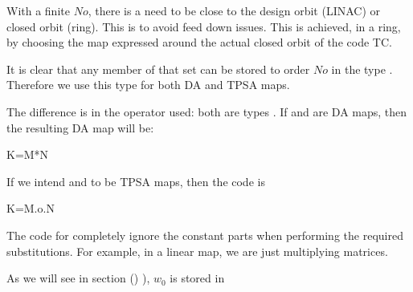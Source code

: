 \documentclass{hitec}     %
\begin{document}
{{{{With a finite $No$, there is a need to be close to the design orbit (LINAC) or closed orbit (ring). This is to avoid feed down issues. This is achieved, in a ring, by choosing the map expressed around the actual closed orbit of the code TC.

It is clear that any member of that set can be stored to order $No$ in the type . Therefore we use this type for both DA and TPSA maps.

 The difference is in the operator used: both are types . If  and  are DA maps, then the resulting DA map  will be:

\begin{code}
K=M*N
\end{code}

If we intend  and  to be TPSA maps, then the code is

\begin{code}
K=M.o.N
\end{code}

The code for  completely ignore the constant parts when performing the required substitutions. For example, in a linear map, we are just multiplying matrices.

As we will see in section () ), $w_0$ is stored in \vn{c_damap%

\subsection{Finding the closed orbit of  a one-turn TPSA map}\label{s:fixtpsa}

In an integrator such as Bmad or PTC, we normally find the exact closed orbit $f$. However what if we have a TPSA map ${m}_{{w}_{0}}$ which is {\bf not} around the closed orbit? We need to solve the following equation:
%
\begin{align} {m}_{{w}_{0}}\left({f}\right)={w}_{1}+{M}_{{w}_{0}}(f-{w}_{0})=f~\ \label{eq:fpeq} \end{align}

}}}}}
\end{document}
